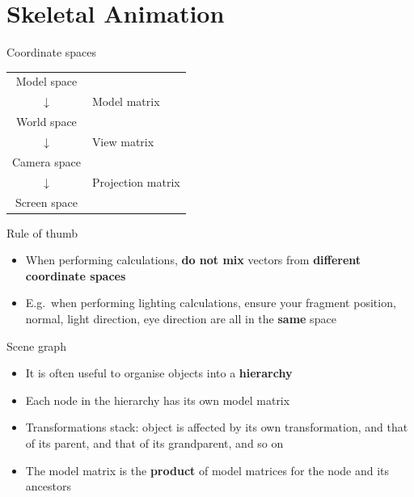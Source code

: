 \part{Skeletal Animation}
\frame{\partpage}

\begin{frame}{Coordinate spaces}
	\begin{center}
		\begin{tabular}{cl}
			\pause Model space \\
			\pause $\downarrow$ & Model matrix \\
			\pause World space \\
			\pause $\downarrow$ & View matrix \\
			\pause Camera space \\
			\pause $\downarrow$ & Projection matrix \\
			\pause Screen space
		\end{tabular}
	\end{center}
\end{frame}

\begin{frame}{Rule of thumb}
	\begin{itemize}
		\pause\item When performing calculations, \textbf{do not mix} vectors from \textbf{different coordinate spaces}
		\pause\item E.g.\ when performing lighting calculations, ensure your fragment position, normal, light direction, eye direction are all
			in the \textbf{same} space
	\end{itemize}
\end{frame}

\begin{frame}{Scene graph}
	\begin{itemize}
		\pause\item It is often useful to organise objects into a \textbf{hierarchy}
		\pause\item Each node in the hierarchy has its own model matrix
		\pause\item Transformations stack: object is affected by its own transformation,
			and that of its parent,
			and that of its grandparent,
			and so on
		\pause\item The model matrix is the \textbf{product} of model matrices for the node and its ancestors
	\end{itemize}
\end{frame}


